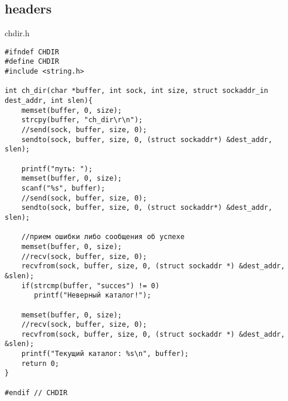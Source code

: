 \documentclass[12pt,a4paper]{report}
\begin{document}
\subsection*{headers}
chdir.h
\begin{lstlisting}
#ifndef CHDIR
#define CHDIR
#include <string.h>

int ch_dir(char *buffer, int sock, int size, struct sockaddr_in dest_addr, int slen){
	memset(buffer, 0, size);
    strcpy(buffer, "ch_dir\r\n");
    //send(sock, buffer, size, 0);
	sendto(sock, buffer, size, 0, (struct sockaddr*) &dest_addr, slen);

    printf("путь: ");
    memset(buffer, 0, size);
    scanf("%s", buffer);
    //send(sock, buffer, size, 0);
	sendto(sock, buffer, size, 0, (struct sockaddr*) &dest_addr, slen);

    //прием ошибки либо сообщения об успехе
    memset(buffer, 0, size);
    //recv(sock, buffer, size, 0);
	recvfrom(sock, buffer, size, 0, (struct sockaddr *) &dest_addr, &slen);
    if(strcmp(buffer, "succes") != 0)
       printf("Неверный каталог!");

    memset(buffer, 0, size);
    //recv(sock, buffer, size, 0);
	recvfrom(sock, buffer, size, 0, (struct sockaddr *) &dest_addr, &slen);
    printf("Текущий каталог: %s\n", buffer);
    return 0;
}

#endif // CHDIR
\end{lstlisting}
\end{document}
